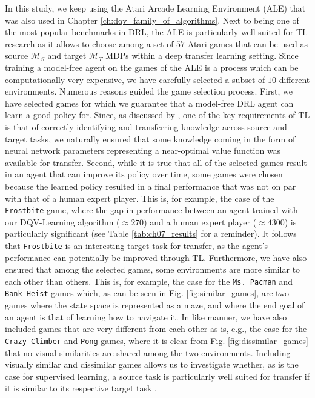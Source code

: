 In this study, we keep using the Atari Arcade Learning Environment (ALE) \citep{bellemare2013arcade} that was also used in Chapter \ref{ch:dqv_family_of_algorithms}. Next to being one of the most popular benchmarks in DRL, the ALE is particularly well suited for TL research as it allows to choose among a set of $57$ Atari games that can be used as source $\mathcal{M}_S$ and target $\mathcal{M}_T$ MDPs within a deep transfer learning setting. Since training a model-free agent on the games of the ALE is a process which can be computationally very expensive, we have carefully selected a subset of $10$ different environments. Numerous reasons guided the game selection process. First, we have selected games for which we guarantee that a model-free DRL agent can learn a good policy for. Since, as discussed by \citet{lazaric2012transfer}, one of the key requirements of TL is that of correctly identifying and transferring knowledge across source and target tasks, we naturally ensured that some knowledge coming in the form of neural network parameters representing a near-optimal value function was available for transfer. Second, while it is true that all of the selected games result in an agent that can improve its policy over time, some games were chosen because the learned policy resulted in a final performance that was not on par with that of a human expert player. This is, for example, the case of the \texttt{Frostbite} game, where the gap in performance between an agent trained with our DQV-Learning algorithm \citep{sabatelli2018deepqv} ($\approx 270$) and a human expert player ($\approx 4300$) is particularly significant (see Table \ref{tab:ch07_results} for a reminder). It follows that \texttt{Frostbite} is an interesting target task for transfer, as the agent's performance can potentially be improved through TL. Furthermore, we have also ensured that among the selected games, some environments are more similar to each other than others. This is, for example, the case for the \texttt{Ms. Pacman} and \texttt{Bank Heist} games which, as can be seen in Fig. \ref{fig:similar_games}, are two games where the state space is represented as a maze, and where the end goal of an agent is that of learning how to navigate it. In like manner, we have also included games that are very different from each other as is, e.g., the case for the \texttt{Crazy Climber} and \texttt{Pong} games, where it is clear from Fig. \ref{fig:dissimilar_games} that no visual similarities are shared among the two environments. Including visually similar and dissimilar games allows us to investigate whether, as is the case for supervised learning, a source task is particularly well suited for transfer if it is similar to its respective target task \citep{mensink2021factors}. 


